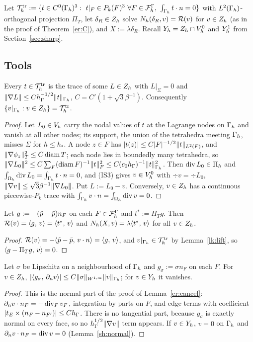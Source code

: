 Let $\mathcal T^{\rm tr}_h:=\{t\in C^0(\Gamma_h)^3:\ t|_F\in P_k(F)^3\ \forall F\in\mathcal F_h^\Gamma,\ \int_{\Gamma_h}t\cdot n=0\}$ with $L^2(\Gamma_h)$-orthogonal projection $\Pi_T$, let $\delta_R\in Z_h$ solve $N_h(\delta_R,v)=\mathcal R(v)$ for $v\in Z_h$ (as in the proof of Theorem~\ref{er:C}), and $X:=\lambda\delta_R$. Recall $Y_h=Z_h\cap V_h^0$ and $Y_h^1$ from Section~\ref{sec:sharp}.

\subsection{Tools}
\begin{lemma}\label{lk:lift}
Every $t\in\mathcal T^{\rm tr}_h$ is the trace of some $L\in Z_h$ with $L|_\Sigma=0$ and $\lVert \nabla L\rVert\le Ch_\Gamma^{-1/2}\lVert t\rVert_{\Gamma_h}$, $C=C'(1+\sqrt3\beta^{-1})$. Consequently $\{v|_{\Gamma_h}:v\in Z_h\}=\mathcal T^{\rm tr}_h$.
\end{lemma}
\begin{proof}
Let $L_0\in V_h$ carry the nodal values of $t$ at the Lagrange nodes on $\Gamma_h$ and vanish at all other nodes; its support, the union of the tetrahedra meeting $\Gamma_h$, misses $\Sigma$ for $h\le h_\ast$. A node $z\in F$ has $|t(z)|\le C|F|^{-1/2}\lVert t\rVert_{L^2(F)}$, and $\lVert \nabla\phi_z\rVert^2_T\le C\operatorname{diam} T$; each node lies in boundedly many tetrahedra, so $\lVert \nabla L_0\rVert^2\le C\sum_F(\operatorname{diam} F)^{-1}\lVert t\rVert^2_F\le C(c_0h_\Gamma)^{-1}\lVert t\rVert^2_{\Gamma_h}$. Then $\operatorname{div} L_0\in\Pi_h$ and $\int_{\Omega_h}\operatorname{div} L_0=\int_{\Gamma_h}t\cdot n=0$, and (IS3) gives $v\in V_h^0$ with $\div v=\div L_0$, $\lVert \nabla v\rVert\le\sqrt3\beta^{-1}\lVert \nabla L_0\rVert$. Put $L:=L_0-v$. Conversely, $v\in Z_h$ has a continuous piecewise-$P_k$ trace with $\int_{\Gamma_h}v\cdot n=\int_{\Omega_h}\operatorname{div} v=0$.
\end{proof}

\begin{lemma}\label{lk:proj}
Let $g:=-(\tilde p-\bar p)n_F$ on each $F\in\mathcal F_h^\Gamma$ and $t^\ast:=\Pi_Tg$. Then $\mathcal R(v)=\langle g,\, v\rangle=\langle t^\ast,\, v\rangle$ and $N_h(X,v)=\lambda\langle t^\ast,\, v\rangle$ for all $v\in Z_h$.
\end{lemma}
\begin{proof}
$\mathcal R(v)=-\langle \tilde p-\bar p,\, v\cdot n\rangle=\langle g,\, v\rangle$, and $v|_{\Gamma_h}\in\mathcal T^{\rm tr}_h$ by Lemma~\ref{lk:lift}, so $\langle g-\Pi_Tg,\, v\rangle=0$.
\end{proof}

\begin{lemma}\label{lk:canc}
Let $\sigma$ be Lipschitz on a neighbourhood of $\Gamma_h$ and $g_\sigma:=\sigma n_F$ on each $F$. For $v\in Z_h$, $|\langle g_\sigma,\, \partial_n v\rangle|\le C\lVert \sigma\rVert_{W^{1,\infty}}\lVert v\rVert_{\Gamma_h}$; for $v\in Y_h$ it vanishes.
\end{lemma}
\begin{proof}
This is the normal part of the proof of Lemma~\ref{er:cancel}: $\partial_n v\cdot n_F=-\operatorname{div}_Fv_F$, integration by parts on $F$, and edge terms with coefficient $|t_E\times(n_F-n_{F'})|\le Ch_\Gamma$. There is no tangential part, because $g_\sigma$ is exactly normal on every face, so no $h_\Gamma^{1/2}\lVert \nabla v\rVert$ term appears. If $v\in Y_h$, $v=0$ on $\Gamma_h$ and $\partial_n v\cdot n_F=\operatorname{div} v=0$ (Lemma~\ref{sh:normal}).
\end{proof}

